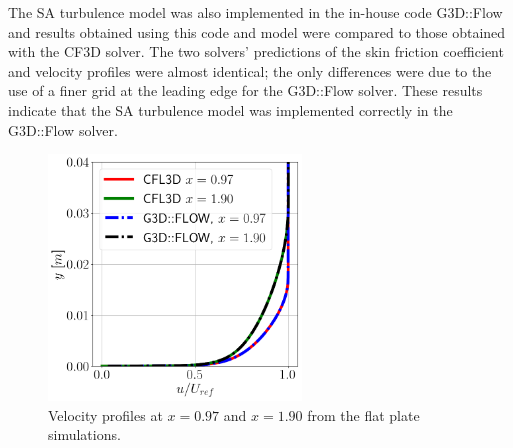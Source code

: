 The SA turbulence model was also implemented in the in-house code G3D::Flow and results obtained using this code and model were compared to those obtained with the CF3D solver. The two solvers' predictions of the skin friction coefficient and velocity profiles were almost identical; the only differences were due to the use of a finer grid at the leading edge for the G3D::Flow solver. These results indicate that the SA turbulence model was implemented correctly in the G3D::Flow solver.
\begin{figure}[t]
  \centering
  \includegraphics[width=0.6\textwidth]{Figures/FPVelComp.png}
  \caption{Velocity profiles at $x=0.97$ and $x=1.90$ from the flat plate simulations.} \label{fig:FPvel}
\end{figure}

